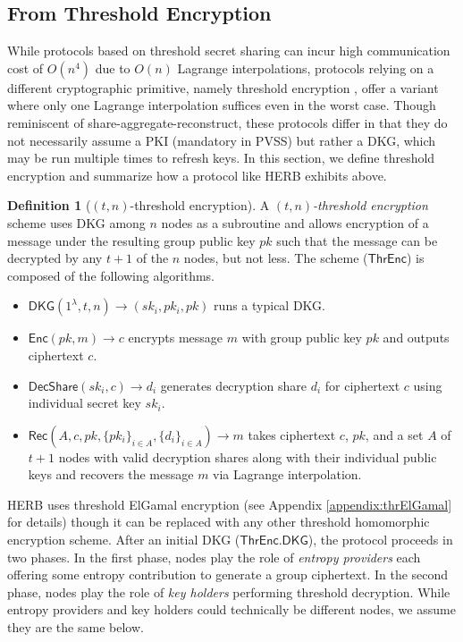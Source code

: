 \documentclass[conference]{IEEEtran}
\theoremstyle{definition}
\newtheorem{definition}[theorem]{Definition}
\theoremstyle{remark}
\begin{document}
\subsection{From Threshold Encryption}
While protocols based on threshold secret sharing can incur high communication cost of $O(n^4)$ due to $O(n)$ Lagrange interpolations, protocols relying on a different cryptographic primitive, namely threshold encryption \cite{desmedt1990Threshold}, offer a variant where only one Lagrange interpolation suffices even in the worst case. Though reminiscent of share-aggregate-reconstruct, these protocols differ in that they do not necessarily assume a PKI (mandatory in PVSS) but rather a DKG, which may be run multiple times to refresh keys. In this section, we define threshold encryption and summarize how a protocol like HERB \cite{cherniaeva2019homomorphic} exhibits above.

\begin{definition}[$(t, n)$-threshold encryption]
A \textit{$(t, n)$-threshold encryption} scheme uses DKG among $n$ nodes as a subroutine and allows encryption of a message under the resulting group public key $pk$ such that the message can be decrypted by any $t + 1$ of the $n$ nodes, but not less. The scheme ($\mathsf{ThrEnc}$) is composed of the following algorithms.
\begin{itemize}
    \item $\mathsf{DKG}(1^\lambda, t, n) \rightarrow (sk_i, pk_i, pk)$ runs a typical DKG.
    \item $\mathsf{Enc}(pk, m) \rightarrow c$ encrypts message $m$ with group public key $pk$ and outputs ciphertext $c$.
    \item $\mathsf{DecShare}(sk_i, c) \rightarrow d_i$ generates decryption share $d_i$ for ciphertext $c$ using individual secret key $sk_i$.
    \item $\mathsf{Rec}(A, c, pk, \{pk_i\}_{i \in A}, \{d_i\}_{i \in A}) \rightarrow m$ takes ciphertext $c$, $pk$, and a set $A$ of $t + 1$ nodes with valid decryption shares along with their individual public keys and recovers the message $m$ via Lagrange interpolation.
\end{itemize}
\end{definition}

HERB uses threshold ElGamal encryption \cite{desmedt1990Threshold, fouque2001threshold} (see Appendix \ref{appendix:thrElGamal} for details) though it can be replaced with any other threshold homomorphic encryption scheme. After an initial DKG ($\mathsf{ThrEnc.DKG}$), the protocol proceeds in two phases. In the first phase, nodes play the role of \textit{entropy providers} each offering some entropy contribution to generate a group ciphertext. In the second phase, nodes play the role of \textit{key holders} performing threshold decryption. While entropy providers and key holders could technically be different nodes, we assume they are the same below.
\end{document}
